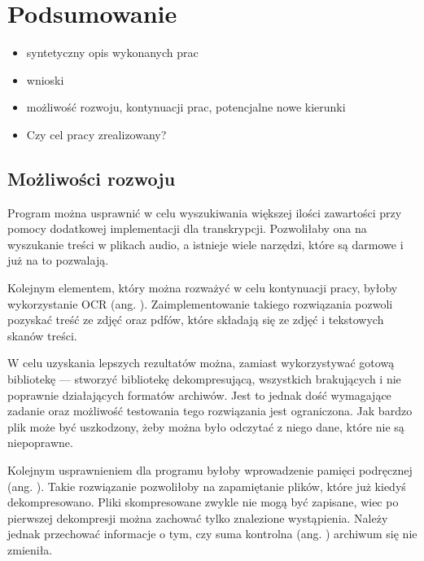 
\chapter{Podsumowanie}


\begin{itemize}
\item syntetyczny opis wykonanych prac
\item wnioski
\item możliwość rozwoju, kontynuacji prac, potencjalne nowe kierunki
\item Czy cel pracy zrealizowany? 
\end{itemize}

\section{Możliwości rozwoju}

Program można usprawnić w celu wyszukiwania większej ilości zawartości przy
pomocy dodatkowej implementacji dla transkrypcji. Pozwoliłaby ona na wyszukanie
treści w plikach audio, a istnieje wiele narzędzi, które są darmowe i już
na to pozwalają.

Kolejnym elementem, który można rozważyć w celu kontynuacji pracy, byłoby 
wykorzystanie OCR (ang. ). Zaimplementowanie
takiego rozwiązania pozwoli pozyskać treść ze zdjęć oraz pdfów, które składają 
się ze zdjęć i tekstowych skanów treści.

W celu uzyskania lepszych rezultatów można, zamiast wykorzystywać gotową 
bibliotekę — stworzyć bibliotekę dekompresującą, wszystkich brakujących i nie
poprawnie działających formatów archiwów. Jest to jednak dość wymagające zadanie
oraz możliwość testowania tego rozwiązania jest ograniczona. Jak bardzo 
plik może być uszkodzony, żeby można było odczytać z niego dane, które nie są
niepoprawne.

Kolejnym usprawnieniem dla programu byłoby wprowadzenie pamięci podręcznej (ang. ).
Takie rozwiązanie pozwoliłoby na zapamiętanie plików, które już kiedyś dekompresowano.
Pliki skompresowane zwykle nie mogą być zapisane, wiec po pierwszej dekompresji
można zachować tylko znalezione wystąpienia. Należy jednak przechować 
informacje o tym, czy suma kontrolna (ang. ) archiwum się nie 
zmieniła.